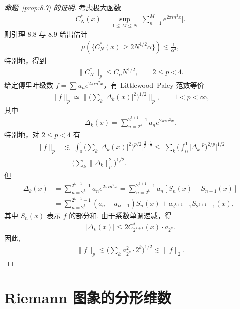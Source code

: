 \begin{proof}[命题~\ref{prop:8.7} 的证明]
考虑极大函数
\begin{align*}
  C_{N}^{*}(x)=\sup_{1\leq M\leq N}\Big|\sum_{n=1}^{M}e^{2\pi i n^{2}x}\Big|.
\end{align*}
则引理 8.8 与 8.9 给出估计
\begin{align*}
  \mu(\{C_{N}^{*}(x)\geq 2N^{1/2}\alpha\})\lesssim\frac{1}{\alpha^{4}},
\end{align*}
特别地，得到
\begin{align*}
  \|C_{N}^{*}\|_{p}\leq C_{p}N^{1/2},\qquad 2\leq p<4.
\end{align*}
给定傅里叶级数 $f = \sum a_n e^{2\pi i n^2 x}$，有 Littlewood--Paley 范数等价
\begin{align*}
  \|f\|_{p}\simeq\Big\|\Big(\sum_{k}|\Delta_{k}(x)|^{2}\Big)^{1/2}\Big\|_{p},\qquad 1<p<\infty,
\end{align*}
其中
\begin{align*}
  \Delta_{k}(x)=\sum_{n=2^{k}}^{2^{k+1}-1}a_{n} e^{2\pi i n^{2}x}.
\end{align*}
特别地，对 $2 \leq p < 4$ 有
\begin{align*}
  \|f\|_{p}
  &\lesssim\Big[\int_{0}^{1}\Big(\sum_{k}|\Delta_{k}(x)|^{2}\Big)^{p/2}\Big]^{\frac{2}{p}\cdot\frac{1}{2}}
  \leq\Big[\sum_{k}\Big(\int_{0}^{1}|\Delta_{k}|^{p}\Big)^{2/p}\Big]^{1/2}\\
  &=\Big(\sum_{k}\|\Delta_{k}\|_{p}^{2}\Big)^{1/2}.
\end{align*}
但
\begin{align*}
  \Delta_{k}(x)
  &=\sum_{n=2^{k}}^{2^{k+1}-1}a_{n} e^{2\pi i n^{2}x}
  =\sum_{n=2^{k}}^{2^{k+1}-1}a_{n}\left[S_{n}(x)-S_{n-1}(x)\right]\\
  &=\sum_{n=2^{k}}^{2^{k+1}-1}(a_{n}-a_{n+1})S_{n}(x)+a_{2^{k+1}-1}S_{2^{k+1}-1}(x),
\end{align*}
其中 $S_{n}(x)$ 表示 $f$ 的部分和. 由于系数单调递减，得
\begin{align*}
  \left|\Delta_{k}(x)\right|\leq 2C_{2^{k+1}}^{*}(x)\cdot a_{2^{k}}.
\end{align*}
因此,
\begin{align*}
  \|f\|_{p}\lesssim\Big(\sum_{k}a_{2^{k}}^{2}\cdot 2^{k}\Big)^{1/2}\lesssim\|f\|_{2}.
\end{align*}
\end{proof}

\section{Riemann 图象的分形维数}

